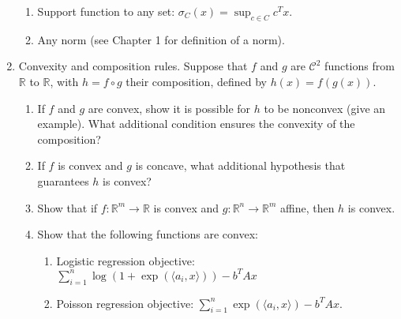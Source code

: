 \documentclass[11pt]{amsart}
\newcommand{\cC}{\mathcal{C}}
\begin{document}
\begin{enumerate}
\begin{enumerate}
\item Support function to any set: 
\(
\sigma_C(x) = \sup_{c \in C} c^Tx.
\)

\item Any norm (see Chapter 1 for definition of a norm). 

\end{enumerate}

\bigskip\bigskip




\item  Convexity and composition rules. Suppose that $f$ and $g$ are $\cC^2$ functions from $\mathbb{R}$ to $\mathbb{R}$, with $h = f\circ g$ their composition, defined by 
\(
h(x) = f(g(x)).
\) 
\begin{enumerate}
\item If $f$ and $g$ are convex, show it is possible for $h$ to be nonconvex (give an example). What additional condition ensures 
the convexity of the composition? 
\item If $f$ is convex and $g$ is concave, what additional hypothesis that guarantees $h$ is convex? 
\item Show that if $f: \mathbb{R}^m \rightarrow \mathbb{R}$ is convex and $g: \mathbb{R}^n \rightarrow \mathbb{R}^m$ affine, then $h$ is convex. 
\item Show that the following functions are convex: 
\begin{enumerate}
\item Logistic regression objective: $\sum_{i=1}^n \log(1+\exp(\langle a_i, x\rangle))- b^TAx$
\item Poisson regression objective: $\sum_{i=1}^n \exp(\langle a_i, x \rangle) - b^TAx$. 
\end{enumerate}
\end{enumerate}



\bigskip\bigskip



\end{enumerate}
\end{document}
